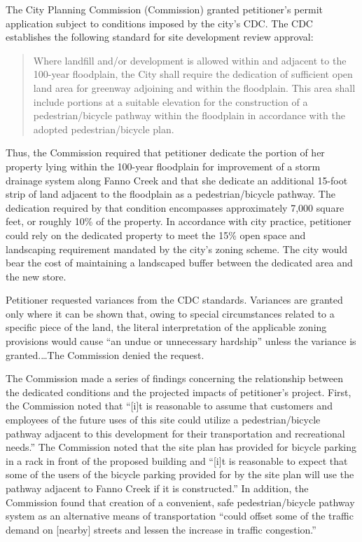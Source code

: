 The City Planning Commission (Commission) granted petitioner's permit
application subject to conditions imposed by the city's CDC. The CDC establishes
the following standard for site development review approval:
\begin{quote}
Where landfill and/or development is allowed within and adjacent to the
100-year floodplain, the City shall require the dedication of sufficient open
land area for greenway adjoining and within the floodplain. This area shall
include portions at a suitable elevation for the construction of a
pedestrian/bicycle pathway within the floodplain in accordance with the adopted
pedestrian/bicycle plan.
\end{quote}

Thus, the Commission required that petitioner dedicate the portion of her
property lying within the 100-year floodplain for improvement of a storm
drainage system along Fanno Creek and that she dedicate an additional 15-foot
strip of land adjacent to the floodplain as a pedestrian/bicycle pathway. The
dedication required by that condition encompasses approximately 7,000 square
feet, or roughly 10\% of the property. In accordance with city practice,
petitioner could rely on the dedicated property to meet the 15\% open space and
landscaping requirement mandated by the city's zoning scheme. The city would
bear the cost of maintaining a landscaped buffer between the dedicated area and
the new store. 

Petitioner requested variances from the CDC standards. Variances are granted
only where it can be shown that, owing to special circumstances related to a
specific piece of the land, the literal interpretation of the applicable zoning
provisions would cause ``an undue or unnecessary hardship'' unless the variance
is granted.\ldots The Commission denied the request.

The Commission made a series of findings concerning the relationship between the
dedicated conditions and the projected impacts of petitioner's project. First,
the Commission noted that ``[i]t is reasonable to assume that customers and
employees of the future uses of this site could utilize a pedestrian/bicycle
pathway adjacent to this development for their transportation and recreational
needs.'' The Commission noted that the site plan has provided for bicycle
parking in a rack in front of the proposed building and ``[i]t is reasonable to
expect that some of the users of the bicycle parking provided for by the site
plan will use the pathway adjacent to Fanno Creek if it is constructed.'' In
addition, the Commission found that creation of a convenient, safe
pedestrian/bicycle pathway system as an alternative means of transportation
``could offset some of the traffic demand on [nearby] streets and lessen the
increase in traffic congestion.'' 

